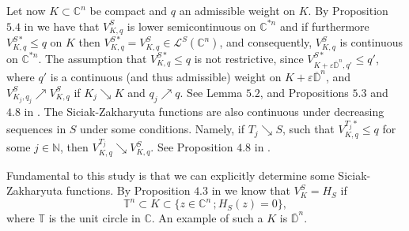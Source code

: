 \documentclass[a4paper,12pt,leqno,english]{article}
\numberwithin{equation}{section}
\begin{document}
Let now $K \subset \mathbb{C}^n$ be compact and $q$ an admissible weight on $K$.
By Proposition $5.4$ in \cite{MagSigSigSno:2023} we have that $V^S_{K, q}$ is lower semicontinuous on $\mathbb{C}^{*n}$ and if furthermore
    $V^{S*}_{K, q} \leq q$ on $K$ then $V^{S*}_{K, q} = V^S_{K, q} \in \mathcal{L}^S(\mathbb{C}^n)$,
    and consequently, $V^S_{K, q}$ is continuous on $\mathbb{C}^{*n}$.
The assumption that $V^{S*}_{K, q} \leq q$ is not restrictive, since $V^{S*}_{K + \varepsilon \overline{\mathbb{D}}^n, q'} \leq q'$,
    where $q'$ is a continuous (and thus admissible) weight on $K + \varepsilon \overline{\mathbb{D}}^n$, and
    $V^S_{K_j, q_j} \nearrow V^S_{K, q}$ if $K_j \searrow K$ and $q_j \nearrow q$.
See Lemma $5.2$, and Propositions $5.3$ and $4.8$ in \cite{MagSigSigSno:2023}.
The Siciak-Zakharyuta functions are also continuous under decreasing sequences in $S$ under some conditions.
Namely, if $T_j \searrow S$, such that $V^{T_j*}_{K, q} \leq q$ for some $j \in \mathbb{N}$, then $V^{T_j}_{K, q} \searrow V^S_{K, q}$.
See Proposition $4.8$ in \cite{MagSigSigSno:2023}.

Fundamental to this study is that we can explicitly determine some Siciak-Zakharyuta functions.
By Proposition $4.3$ in \cite{MagSigSigSno:2023} we know that $V^S_K = H_S$ if
\begin{equation*}
    \mathbb{T}^n \subset K \subset \{z \in \mathbb{C}^n \,; H_S(z) = 0\},
\end{equation*}
where $\mathbb{T}$ is the unit circle in $\mathbb{C}$.
An example of such a $K$ is $\overline{\mathbb{D}}^n$.
\end{document}
